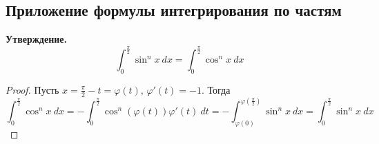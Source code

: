 \subsection{Приложение формулы интегрирования по частям}

\textbf{Утверждение.}
\begin{equation*}
  \int_{0}^{\frac{\pi}{2}} \sin^n x \: dx =
  \int_{0}^{\frac{\pi}{2}} \cos^n x \: dx
\end{equation*}
\begin{proof}
    Пусть $x = \frac{\pi}{2} - t = \varphi(t), \, \varphi'(t) = -1$. Тогда
    \begin{equation*}
      \int_{0}^{\frac{\pi}{2}} \cos^n x \: dx = -\int_{0}^{\frac{\pi}{2}} \cos^n(\varphi(t))\varphi'(t) \: dt = -\int_{\varphi(0)}^{\varphi(\frac{\pi}{2})} \sin^n x\: dx =\int_{0}^{\frac{\pi}{2}} \sin^n x \: dx
    \end{equation*}
\end{proof}

